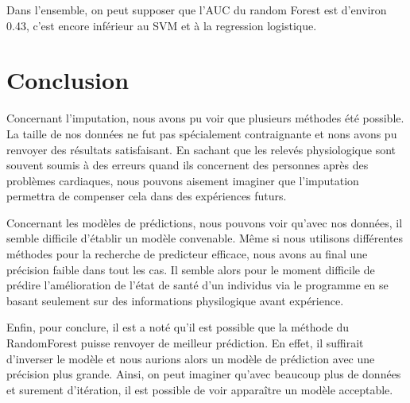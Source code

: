 \documentclass[]{article}
\begin{document}
Dans l'ensemble, on peut supposer que l'AUC du random Forest est
d'environ 0.43, c'est encore inférieur au SVM et à la regression
logistique.

\hypertarget{conclusion}{%
\section{Conclusion}\label{conclusion}}

Concernant l'imputation, nous avons pu voir que plusieurs méthodes été
possible. La taille de nos données ne fut pas spécialement contraignante
et nons avons pu renvoyer des résultats satisfaisant. En sachant que les
relevés physiologique sont souvent soumis à des erreurs quand ils
concernent des personnes après des problèmes cardiaques, nous pouvons
aisement imaginer que l'imputation permettra de compenser cela dans des
expériences futurs.

Concernant les modèles de prédictions, nous pouvons voir qu'avec nos
données, il semble difficile d'établir un modèle convenable. Même si
nous utilisons différentes méthodes pour la recherche de predicteur
efficace, nous avons au final une précision faible dans tout les cas. Il
semble alors pour le moment difficile de prédire l'amélioration de
l'état de santé d'un individus via le programme en se basant seulement
sur des informations physilogique avant expérience.

Enfin, pour conclure, il est a noté qu'il est possible que la méthode du
RandomForest puisse renvoyer de meilleur prédiction. En effet, il
suffirait d'inverser le modèle et nous aurions alors un modèle de
prédiction avec une précision plus grande. Ainsi, on peut imaginer
qu'avec beaucoup plus de données et surement d'itération, il est
possible de voir apparaître un modèle acceptable.
\end{document}
